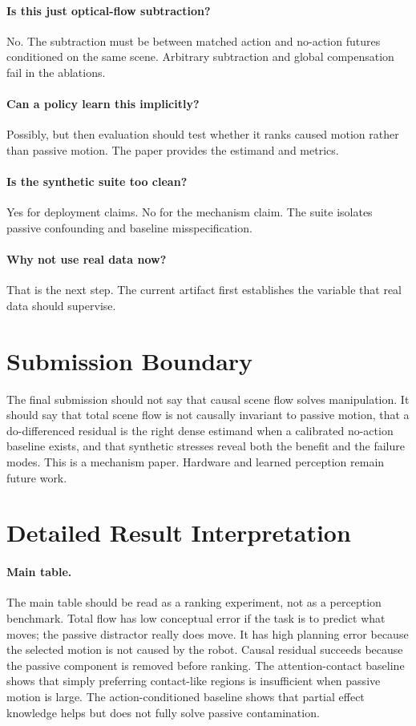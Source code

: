 \documentclass{article}
\begin{document}
\paragraph{Is this just optical-flow subtraction?}
No.  The subtraction must be between matched action and no-action futures conditioned on
the same scene.  Arbitrary subtraction and global compensation fail in the ablations.

\paragraph{Can a policy learn this implicitly?}
Possibly, but then evaluation should test whether it ranks caused motion rather than
passive motion.  The paper provides the estimand and metrics.

\paragraph{Is the synthetic suite too clean?}
Yes for deployment claims.  No for the mechanism claim.  The suite isolates passive
confounding and baseline misspecification.

\paragraph{Why not use real data now?}
That is the next step.  The current artifact first establishes the variable that real
data should supervise.

\section{Submission Boundary}

The final submission should not say that causal scene flow solves manipulation.  It
should say that total scene flow is not causally invariant to passive motion, that a
do-differenced residual is the right dense estimand when a calibrated no-action baseline
exists, and that synthetic stresses reveal both the benefit and the failure modes.  This
is a mechanism paper.  Hardware and learned perception remain future work.

\section{Detailed Result Interpretation}

\paragraph{Main table.}
The main table should be read as a ranking experiment, not as a perception benchmark.
Total flow has low conceptual error if the task is to predict what moves; the passive
distractor really does move.  It has high planning error because the selected motion is
not caused by the robot.  Causal residual succeeds because the passive component is
removed before ranking.  The attention-contact baseline shows that simply preferring
contact-like regions is insufficient when passive motion is large.  The
action-conditioned baseline shows that partial effect knowledge helps but does not fully
solve passive contamination.
\end{document}
